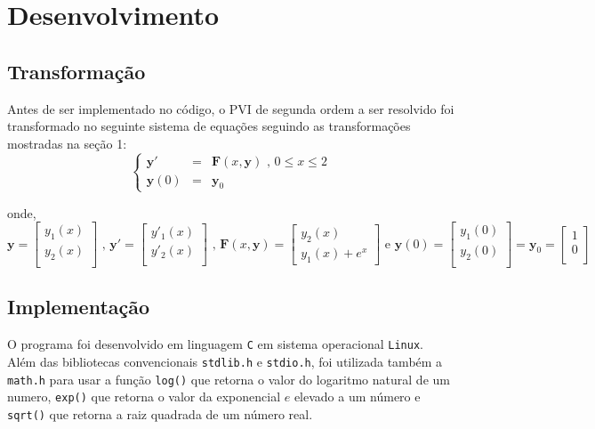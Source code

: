 \section{Desenvolvimento}

\subsection{Transformação}

Antes de ser implementado no código, o PVI de segunda ordem a ser resolvido foi transformado no seguinte sistema
de equações seguindo as transformações mostradas na seção 1:
\[
	\left \{
		\begin{array}{lll}
			\mathbf{y}'   & = & \mathbf{F}(x, \mathbf{y}) \text{ , } 0 \leq x \leq 2 \\
			\mathbf{y}(0) & = & \mathbf{y}_{0}
		\end{array}
	\right .
\]

onde,
\[
	\mathbf{y} = 
	\begin{bmatrix}
		y_1(x) \\
		y_2(x) \\
	\end{bmatrix}
	\text{ , }
	\mathbf{y}' =
	\begin{bmatrix}
		y'_1(x) \\
		y'_2(x) \\
	\end{bmatrix}
	\text{ , }
	\mathbf{F}(x, \mathbf{y}) =
	\begin{bmatrix}
		y_2(x) \\
		y_1(x) + e^x
	\end{bmatrix}
	\text{ e }
	\mathbf{y}(0) =
	\begin{bmatrix}
		y_1(0) \\
		y_2(0) \\
	\end{bmatrix} =
	\mathbf{y}_0 =
	\begin{bmatrix}
		1 \\
		0 \\
	\end{bmatrix}
\]

\subsection{Implementação}

O programa foi desenvolvido em linguagem \texttt{C} em sistema operacional \texttt{Linux}.
Além das bibliotecas convencionais \texttt{stdlib.h} e \texttt{stdio.h}, foi utilizada também
a \texttt{math.h} para usar a função \texttt{log()} que retorna o valor do logaritmo natural de um
numero, \texttt{exp()} que retorna o valor da exponencial $e$ elevado a
um número e \texttt{sqrt()} que retorna a raiz quadrada de um número real.

